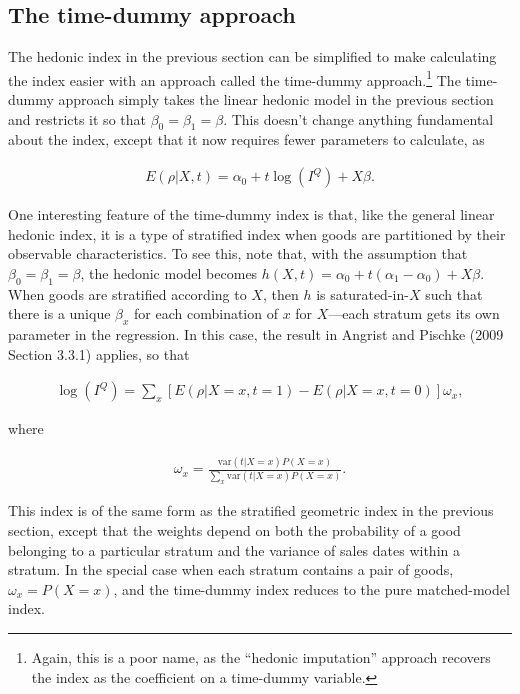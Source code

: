 \documentclass[]{article}
\begin{document}
\hypertarget{the-time-dummy-approach}{%
\subsection{The time-dummy approach}\label{the-time-dummy-approach}}

The hedonic index in the previous section can be simplified to make calculating the index easier with an approach called the time-dummy approach.\footnote{Again, this is a poor name, as the ``hedonic imputation'' approach recovers the index as the coefficient on a time-dummy variable.} The time-dummy approach simply takes the linear hedonic model in the previous section and restricts it so that \(\beta_{0} = \beta_{1} = \beta\). This doesn't change anything fundamental about the index, except that it now requires fewer parameters to calculate, as

\begin{align*}
E(\rho | X, t) = \alpha_{0} + t \log(I^{Q}) + X \beta.
\end{align*}

One interesting feature of the time-dummy index is that, like the general linear hedonic index, it is a type of stratified index when goods are partitioned by their observable characteristics. To see this, note that, with the assumption that \(\beta_{0} = \beta_{1} = \beta\), the hedonic model becomes \(h(X, t) = \alpha_{0} + t (\alpha_{1} - \alpha_{0}) + X\beta\). When goods are stratified according to \(X\), then \(h\) is saturated-in-\(X\) such that there is a unique \(\beta_x\) for each combination of \(x\) for \(X\)---each stratum gets its own parameter in the regression. In this case, the result in Angrist and Pischke (2009 Section 3.3.1) applies, so that

\begin{align*}
\log(I^{Q}) = \sum_{x}[E(\rho | X = x, t = 1) - E(\rho | X = x, t = 0)] \omega_{x},
\end{align*}

where

\begin{align*}
\omega_{x} = \frac{\text{var}(t | X = x) P(X = x)}{\sum_{x} \text{var}(t | X = x) P(X = x)}.
\end{align*}

This index is of the same form as the stratified geometric index in the previous section, except that the weights depend on both the probability of a good belonging to a particular stratum and the variance of sales dates within a stratum. In the special case when each stratum contains a pair of goods, \(\omega_{x} = P(X = x)\), and the time-dummy index reduces to the pure matched-model index.
\end{document}
